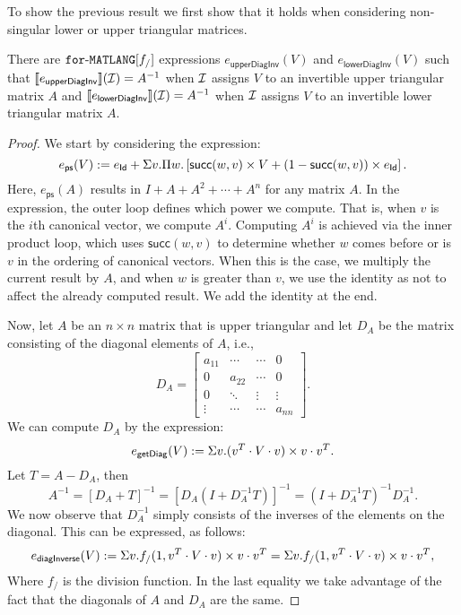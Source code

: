 
To show the previous result we first show that it holds when considering non-singular lower or upper triangular matrices.
\begin{lemma}\label{prop:upperlowerinverse}
There are $\texttt{for}\text{-}\texttt{MATLANG}[f_/]$ expressions $e_{\mathsf{upperDiagInv}}(V)$ and $e_{\mathsf{lowerDiagInv}}(V)$
such that $\llbracket e_{\mathsf{upperDiagInv}} \rrbracket(\mathcal{I})=A^{-1}$ when $\mathcal{I}$ assigns $V$
to an invertible upper triangular matrix $A$ and $\llbracket e_{\mathsf{lowerDiagInv}} \rrbracket(\mathcal{I})=A^{-1}$ when $\mathcal{I}$ assigns $V$
to an invertible lower triangular matrix $A$.
\end{lemma}

\begin{proof} We start by considering the expression:
    $$
    e_{\mathsf{ps}}(V):= e_{\mathsf{Id}} + \Sigma v.\Pi w. \left[ \mathsf{succ}(w,v)\times V + (1 - \mathsf{succ}(w,v))\times e_{\mathsf{Id}} \right].
    $$
    Here, $e_{\mathsf{ps}}(A)$ results in $I+A+A^2+\cdots + A^n$ for any matrix $A$. In the expression, the outer loop defines which power we compute. 
    That is, when $v$ is the $i$th canonical vector, we compute $A^i$.
    Computing $A^i$ is achieved via the inner product loop, which uses $\mathsf{succ}(w,v)$ to 
    determine whether $w$ comes before or is $v$ in the ordering of canonical vectors.
    When this is the case, we multiply the current result by $A$, and when $w$ is greater 
    than $v$, we use the identity as not to affect the already computed result. We add the identity at the end.

    Now, let $A$ be an $n\times n$ matrix that is upper triangular and let $D_A$ be the matrix consisting of the diagonal elements of $A$, i.e.,
    \[
    D_A = \begin{bmatrix}
        a_{11} & \cdots & \cdots &  0 \\
        0 & a_{22} & \cdots &  0 \\
        0 & \ddots & \vdots & \vdots \\
        \vdots & \cdots& \cdots & a_{nn}
    \end{bmatrix}.
    \]
    We can compute $D_A$ by the expression:
    $$
    e_{\mathsf{getDiag}}(V) := \Sigma v. (v^T\cdot V\cdot v) \times v\cdot v^T.
    $$
    Let $T=A-D_A$, then
    $$
    A^{-1}=\left[ D_A+T \right]^{-1}= \left[ D_A\left( I+D_A^{-1}T\right) \right]^{-1} = \left( I+D_A^{-1}T\right)^{-1}D_A^{-1}.
    $$
    We now observe that $D_{A}^{-1}$ simply consists of the inverses of the elements on the diagonal. This can be expressed, as follows:
    $$
    e_{\mathsf{diagInverse}}(V):=\Sigma v. f_{/}(1,v^T\cdot V\cdot v)\times v\cdot v^T=\Sigma v. f_{/}(1,v^T\cdot V\cdot v)\times v\cdot v^T,
    $$
    Where $f_{/}$ is the division function. In the last equality we take advantage of the fact that the diagonals of $A$ and $D_A$ are the same.


\end{proof}
